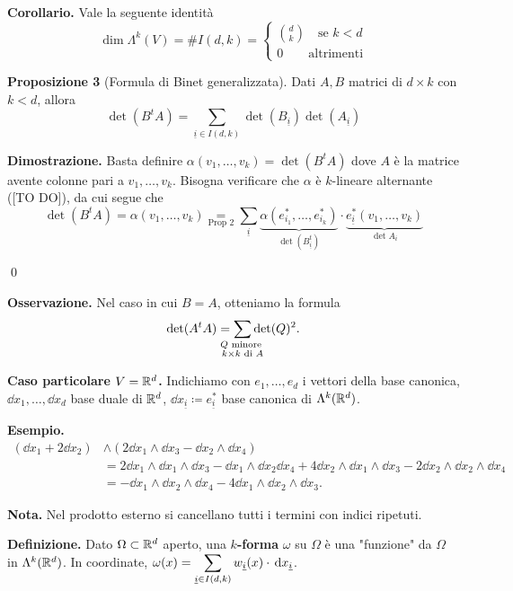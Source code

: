 \textbf{Corollario.} Vale la seguente identità 
%
$$
\dim \Lambda^k(V) = \# I(d,k) = 
\begin{cases}
	\binom{d}{k} \quad \text{se } k < d \\
	0 \qquad \text{altrimenti} 
\end{cases} 
$$
%

\textbf{Proposizione 3} (Formula di Binet generalizzata).
Dati $A,B$ matrici di $d \times k$ con $k < d$, allora
%
$$
	\det(B^tA) = \sum_{\underline{i} \in I(d,k)} \det(B_{\underline{i}}) \det (A_{\underline{i}})
$$
%

\textbf{Dimostrazione.} Basta definire $\alpha(v_1,\ldots,v_k) = \det(B^t A)$ dove $A$ è la matrice avente colonne pari a $v_1,\ldots,v_k$.
Bisogna verificare che $\alpha$ è $k$-lineare alternante ([TO DO]), da cui segue che
%
$$
	\det(B^tA) = \alpha(v_1,\ldots,v_k) 
	\underset{\text{Prop 2} }{=} \sum_{\underline{i}} \underbrace{\alpha(e_{i_1}^*,\ldots,e_{i_k}^*)}_{\det(B_{\underline{i}}^t)}
	\cdot \underbrace{e_{\underline{i}}^* (v_1,\ldots,v_k)}_{\det A_i}
$$
%

\qed

\textbf{Osservazione.} Nel caso in cui $B = A$, otteniamo la formula
%
$$
	\det(A^tA) = \sum_{\mathclap{\substack{Q \text{ minore } \\ k \times k \text{ di } A }}} \det(Q)^2.
$$
%


\textbf{Caso particolare $V = \mathbb R^d$.} Indichiamo con $e_1,\ldots,e_d$ i vettori della base canonica, $\dd x_1,\ldots, \dd x_d$ base duale di $\mathbb R^d$, $\dd x_{\underline{i}} \coloneqq e_{\underline{i}}^*$ base canonica di $\Lambda^k(\mathbb R^d)$.


\textbf{Esempio.}
\begin{align*}
	(\dd x_1 + 2 \dd x_2) & \wedge (2 \dd x_1 \wedge \dd x_3 - \dd x_2 \wedge\dd x_4) \\
	& = 2 \dd x_1 \wedge\dd x_1 \wedge\dd x_3 - \dd x_1 \wedge\dd x_2 \dd x_4 + 4 \dd x_2 \wedge\dd x_1 \wedge\dd x_3 - 2 \dd x_2 \wedge\dd x_2 \wedge\dd x_4 \\
	& = - \dd x_1 \wedge\dd x_2 \wedge\dd x_4 - 4 \dd x_1 \wedge\dd x_2 \wedge\dd x_3.
\end{align*}

\textbf{Nota.} Nel prodotto esterno si cancellano tutti i termini con indici ripetuti.

\textbf{Definizione.} Dato $\Omega \subset \mathbb R^d$ aperto, una \textbf{$k$-forma} $\omega$ su $\Omega$ è una "funzione"  da $\Omega$ in $\Lambda^k(\mathbb R^d)$. In coordinate, $\displaystyle \omega(x) = \sum_{\underline{i} \in I(d,k)} w_{\underline{i}}(x) \cdot \,\mathrm{d} x_{\underline{i}}$.

